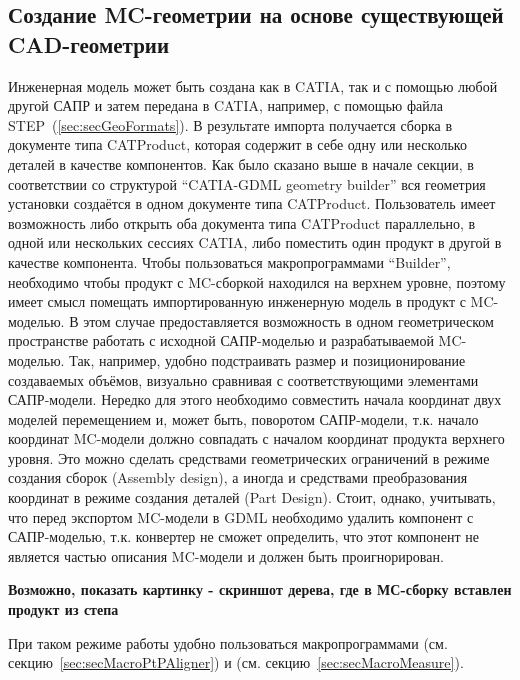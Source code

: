 \subsection[Создание MC-геометрии на основе существующей CAD-геометрии]{Создание MC-геометрии на основе существующей\\ CAD-геометрии}\label{sec:secMCfromCAD}

Инженерная модель может быть создана как в CATIA, так и с помощью любой другой САПР и затем передана в CATIA, например, с помощью файла STEP~(\ref{sec:secGeoFormats}).
В результате импорта получается сборка в документе типа CATProduct, которая содержит в себе одну или несколько деталей в качестве компонентов.
Как было сказано выше в начале секции, в соответствии со структурой ``CATIA-GDML geometry builder'' вся геометрия установки создаётся в одном документе типа CATProduct. 
Пользователь имеет возможность либо открыть оба документа типа CATProduct параллельно, в одной или нескольких сессиях CATIA, либо поместить один продукт в другой в качестве компонента. Чтобы пользоваться макропрограммами ``Builder'', необходимо чтобы продукт с MC-сборкой находился на верхнем уровне, поэтому имеет смысл помещать импортированную инженерную модель в продукт с MC-моделью. В этом случае предоставляется возможность в одном геометрическом пространстве работать с исходной САПР-моделью и разрабатываемой MC-моделью. Так, например, удобно подстраивать размер и позиционирование создаваемых объёмов, визуально сравнивая с соответствующими элементами САПР-модели. Нередко для этого необходимо совместить начала координат двух моделей перемещением и, может быть, поворотом САПР-модели, т.к. начало координат MC-модели должно совпадать с началом координат продукта верхнего уровня. Это можно сделать средствами геометрических ограничений в режиме создания сборок (Assembly design), а иногда и средствами преобразования координат в режиме создания деталей (Part Design). Стоит, однако, учитывать, что перед экспортом MC-модели в GDML необходимо удалить компонент с САПР-моделью, т.к. конвертер  не сможет определить, что этот компонент не является частью описания MC-модели и должен быть проигнорирован.

\textbf{Возможно, показать картинку - скриншот дерева, где в МС-сборку вставлен продукт из степа}

При таком режиме работы удобно пользоваться макропрограммами  (см. секцию~\ref{sec:secMacroPtPAligner}) и  (см. секцию~\ref{sec:secMacroMeasure}).

